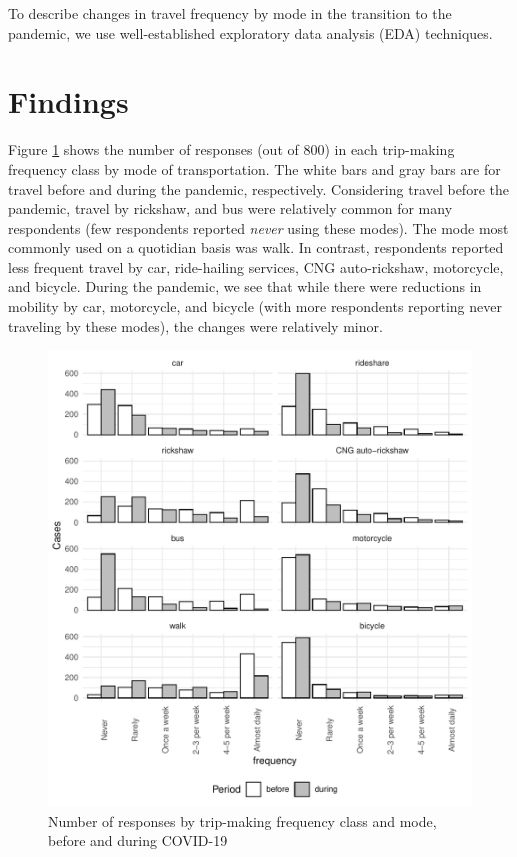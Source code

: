\documentclass[]{elsarticle} %
\begin{document}
To describe changes in travel frequency by mode in the transition to the
pandemic, we use well-established exploratory data analysis (EDA)
techniques.

\hypertarget{findings}{%
\section{Findings}\label{findings}}

Figure \ref{fig:column-plot-cases} shows the number of responses (out of
800) in each trip-making frequency class by mode of transportation. The
white bars and gray bars are for travel before and during the pandemic,
respectively. Considering travel before the pandemic, travel by
rickshaw, and bus were relatively common for many respondents (few
respondents reported \emph{never} using these modes). The mode most
commonly used on a quotidian basis was walk. In contrast, respondents
reported less frequent travel by car, ride-hailing services, CNG
auto-rickshaw, motorcycle, and bicycle. During the pandemic, we see that
while there were reductions in mobility by car, motorcycle, and bicycle
(with more respondents reporting never traveling by these modes), the
changes were relatively minor.

\begin{figure}
\centering
\includegraphics{Frequency-of-Travel-by-Mode-COVID-19-Bangladesh_files/figure-latex/column-plot-cases-before-after-1.pdf}
\caption{\label{fig:column-plot-cases}Number of responses by trip-making
frequency class and mode, before and during COVID-19}
\end{figure}
\end{document}

